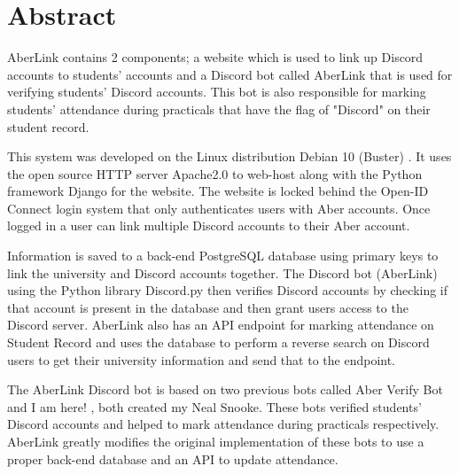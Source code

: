 \thispagestyle{empty}


\section*{\centering Abstract}

AberLink contains 2 components; a website which is used to link up Discord \cite{discord} accounts to students' accounts and a Discord bot called AberLink that is used for verifying students' Discord accounts. This bot is also responsible for marking students' attendance during practicals that have the flag of "Discord" on their student record.

This system was developed on the Linux distribution Debian 10 (Buster) \cite{debian}. It uses the open source HTTP server Apache2.0 \cite{apache2} to web-host along with the Python framework Django \cite{Django} for the website. The website is locked behind the Open-ID Connect \cite{OpenID} login system that only authenticates users with Aber accounts. Once logged in a user can link multiple Discord accounts to their Aber account. 

Information is saved to a back-end  PostgreSQL \cite{psql} database using primary keys to link the university and Discord accounts together. The Discord bot (AberLink) using the Python library Discord.py \cite{discord.py} then verifies Discord accounts by checking if that account is present in the database and then grant users access to the Discord server. AberLink also has an API endpoint for marking attendance on Student Record and uses the database to perform a reverse search on Discord users to get their university information and send that to the endpoint.

The AberLink Discord bot is based on two previous bots called Aber Verify Bot \cite{aber_verify} and I am here! \cite{i_am_here}, both created my Neal Snooke. These bots verified students' Discord accounts and helped to mark attendance during practicals respectively. AberLink greatly modifies the original implementation of these bots to use a proper back-end database and an API to update attendance.

